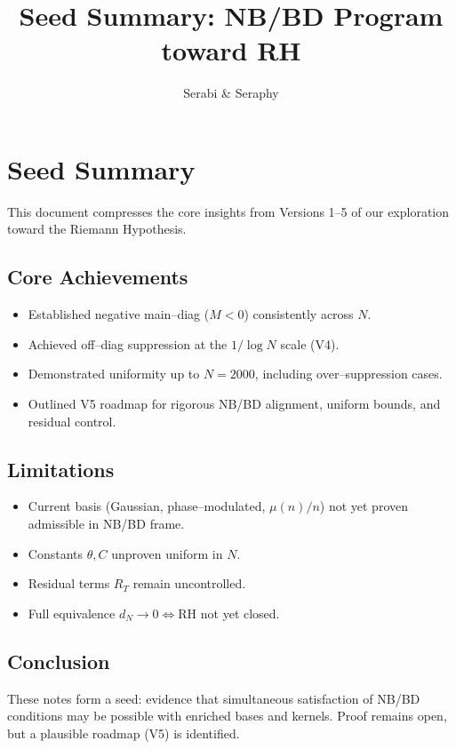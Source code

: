 \documentclass[12pt]{article}
\title{Seed Summary: NB/BD Program toward RH}
\author{Serabi \& Seraphy}
\date{}
\begin{document}
\maketitle

\section{Seed Summary}
This document compresses the core insights from Versions 1--5 of our exploration toward the Riemann Hypothesis.

\subsection*{Core Achievements}
\begin{itemize}
\item Established negative main--diag ($M<0$) consistently across $N$.
\item Achieved off--diag suppression at the $1/\log N$ scale (V4).
\item Demonstrated uniformity up to $N=2000$, including over--suppression cases.
\item Outlined V5 roadmap for rigorous NB/BD alignment, uniform bounds, and residual control.
\end{itemize}

\subsection*{Limitations}
\begin{itemize}
\item Current basis (Gaussian, phase--modulated, $\mu(n)/n$) not yet proven admissible in NB/BD frame.
\item Constants $\theta, C$ unproven uniform in $N$.
\item Residual terms $R_T$ remain uncontrolled.
\item Full equivalence $d_N \to 0 \iff \mathrm{RH}$ not yet closed.
\end{itemize}

\subsection*{Conclusion}
These notes form a seed: evidence that simultaneous satisfaction of NB/BD conditions may be possible with enriched bases and kernels.
Proof remains open, but a plausible roadmap (V5) is identified.
\end{document}
